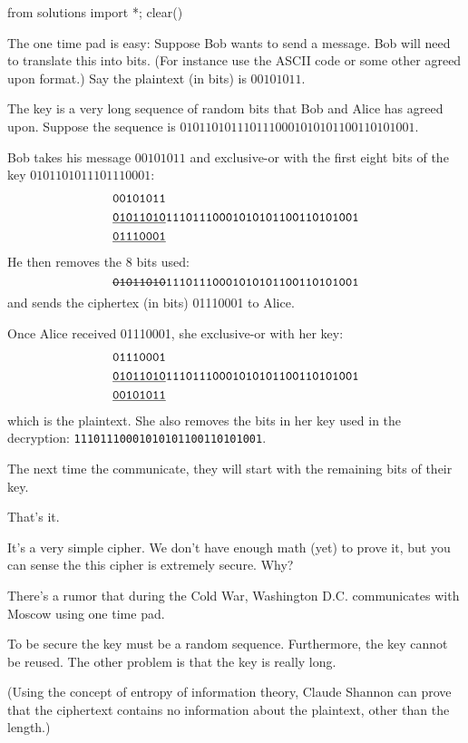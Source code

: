 \begin{python0}
from solutions import *; clear()
\end{python0}

The one time pad is easy:
Suppose Bob wants to send a message.
Bob will need to translate this into bits.
(For instance use the ASCII code or some other agreed upon format.)
Say the plaintext (in bits) is $00101011$.

The key is a very long sequence of random bits that
Bob and Alice has agreed upon.
Suppose the sequence is $0101101011101110001010101100110101001$.

Bob takes his message $00101011$ and exclusive-or with the first eight bits of
the key $0101101011101110001$:
\begin{align*}
  &\texttt{00101011} \\
  &\texttt{\underline{01011010}11101110001010101100110101001} \\
  &\texttt{\underline{01110001}}
\end{align*}
He then removes the 8 bits used:
\[
  \texttt{\textso{01011010}11101110001010101100110101001} \\
\]
and sends the ciphertex (in bits) 01110001 to Alice.

Once Alice received 01110001, she exclusive-or with her key:
\begin{align*}
  &\texttt{01110001} \\
  &\texttt{\underline{01011010}11101110001010101100110101001} \\
  &\texttt{\underline{00101011}}
\end{align*}
which is the plaintext.
She also removes the bits in her key used in the decryption:
\texttt{11101110001010101100110101001}.

The next time the communicate, they will start with the remaining bits
of their key.

That's it.

It's a very simple cipher.
We don't have enough math (yet) to prove it, but you can sense the this
cipher is extremely secure.
Why?



There's a rumor that during the Cold War, Washington D.C. communicates with
Moscow using one time pad.

To be secure the key must be a random sequence.
Furthermore, the key cannot be reused.
The other problem is that the key is really long.

(Using the concept of entropy of information theory, Claude Shannon can prove that
the ciphertext contains no information about the plaintext, other than the length.)



